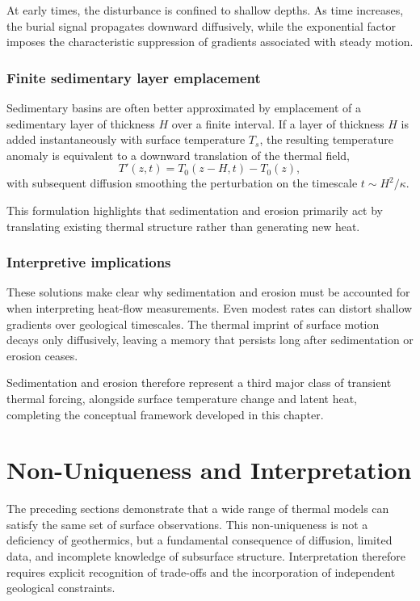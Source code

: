 At early times, the disturbance is confined to shallow depths. As time increases, the burial signal propagates downward diffusively, while the exponential factor imposes the characteristic suppression of gradients associated with steady motion.

\subsubsection*{Finite sedimentary layer emplacement}

Sedimentary basins are often better approximated by emplacement of a sedimentary layer of thickness $H$ over a finite interval. If a layer of thickness $H$ is added instantaneously with surface temperature $T_s$, the resulting temperature anomaly is equivalent to a downward translation of the thermal field,
\begin{equation}
T'(z,t) =
T_0(z-H,t) - T_0(z),
\end{equation}
with subsequent diffusion smoothing the perturbation on the timescale $t \sim H^2/\kappa$.

This formulation highlights that sedimentation and erosion primarily act by translating existing thermal structure rather than generating new heat.

\subsubsection*{Interpretive implications}

These solutions make clear why sedimentation and erosion must be accounted for when interpreting heat-flow measurements. Even modest rates can distort shallow gradients over geological timescales. The thermal imprint of surface motion decays only diffusively, leaving a memory that persists long after sedimentation or erosion ceases.

Sedimentation and erosion therefore represent a third major class of transient thermal forcing, alongside surface temperature change and latent heat, completing the conceptual framework developed in this chapter.

\section{Non-Uniqueness and Interpretation}

The preceding sections demonstrate that a wide range of thermal models can satisfy the same set of surface observations. This non-uniqueness is not a deficiency of geothermics, but a fundamental consequence of diffusion, limited data, and incomplete knowledge of subsurface structure. Interpretation therefore requires explicit recognition of trade-offs and the incorporation of independent geological constraints.

